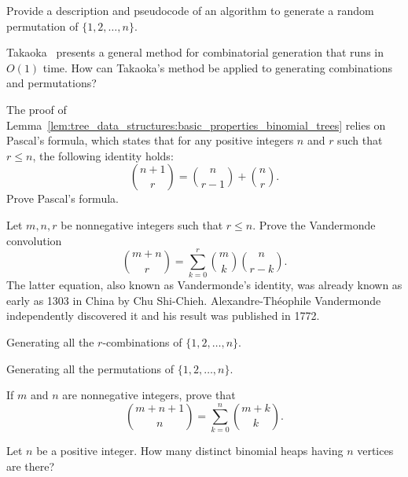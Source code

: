\begin{problem}
\item Provide a description and pseudocode of an algorithm to generate
  a random permutation of $\{1, 2, \dots, n\}$.

\item Takaoka~\cite{Takaoka1999b} presents a
  general method for combinatorial
  generation that runs in $O(1)$ time. How can Takaoka's method be
  applied to generating combinations and permutations?

\item The proof of
  Lemma~\ref{lem:tree_data_structures:basic_properties_binomial_trees}
  relies on Pascal's formula, which states that
  for any positive integers $n$ and $r$ such that $r \leq n$, the
  following identity holds:
  \[
  \binom{n+1}{r}
  =
  \binom{n}{r-1} + \binom{n}{r}.
  \]
  Prove Pascal's formula.

\item Let $m,n,r$ be nonnegative integers such that $r \leq n$. Prove
  the Vandermonde convolution
  \[
  \binom{m + n}{r}
  =
  \sum_{k=0}^r \binom{m}{k} \binom{n}{r-k}.
  \]
  The latter equation, also known as Vandermonde's identity, was
  already known as early as 1303 in China by Chu
  Shi-Chieh. Alexandre-Th\'eophile
  Vandermonde independently
  discovered it and his result was published in 1772.

\begin{algorithm}[!htbp]

\caption{Generating all the $r$-combinations of $\{1, 2, \dots, n\}$.}
\label{alg:tree_data_structures:generate_all_r_combinations}
\end{algorithm}

\begin{algorithm}[!htbp]

\caption{Generating all the permutations of $\{1, 2, \dots, n\}$.}
\label{alg:tree_data_structures:generate_all_permutations}
\end{algorithm}

\item If $m$ and $n$ are nonnegative integers, prove that
  \[
  \binom{m + n + 1}{n}
  =
  \sum_{k=0}^n \binom{m + k}{k}.
  \]

\item Let $n$ be a positive integer. How many distinct
  binomial heaps having $n$ vertices are there?


\end{problem}

